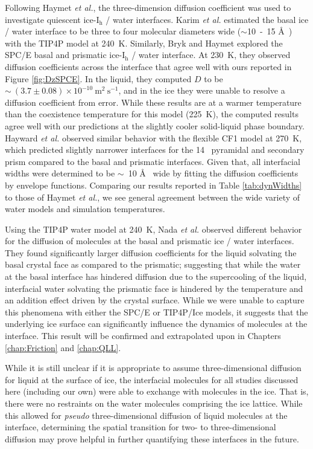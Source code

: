Following Haymet \textit{et al.}, the three-dimension diffusion
coefficient was used to investigate quiescent ice-I$_\mathrm{h}$ /
water
interfaces. \cite{Karim1987,Karim1988,Hayward2001,Bryk2002,Hayward2002}
Karim \textit{et al.} estimated the basal ice / water interface to be
three to four molecular diameters wide ($\sim$10~-~15 \AA~) with the
TIP4P model at 240~K.\cite{Karim1987,Karim1988} Similarly, Bryk and
Haymet explored the SPC/E basal and prismatic ice-I$_\mathrm{h}$ /
water interface.\cite{Bryk2002} At 230~K, they observed diffusion
coefficients across the interface that agree well with ours reported
in Figure \ref{fig:DzSPCE}. In the liquid, they computed $D$ to be
$\sim~(3.7 \pm 0.08) \times 10^{-10}~\mathrm{m}^{2}~\mathrm{s}^{-1}$,
and in the ice they were unable to resolve a diffusion coefficient
from error. While these results are at a warmer temperature than the
coexistence temperature for this model (225~K), the computed results
agree well with our predictions at the slightly cooler solid-liquid
phase boundary. Hayward \textit{et al.} observed similar behavior with
the flexible CF1 model at 270~K, which predicted slightly narrower
interfaces for the 14\degree~ pyramidal and secondary prism compared
to the basal and prismatic interfaces.\cite{Hayward2001,Hayward2002}
Given that, all interfacial widths were determined to be $\sim$~10
\AA~ wide by fitting the diffusion coefficients by envelope
functions. Comparing our results reported in Table \ref{tab:dynWidths}
to those of Haymet \textit{et al.}, we see general agreement between
the wide variety of water models and simulation temperatures.

Using the TIP4P water model at 240~K, Nada \textit{et al.}  observed
different behavior for the diffusion of molecules at the basal and
prismatic ice / water interfaces.\cite{Nada1995} They found
significantly larger diffusion coefficients for the liquid solvating
the basal crystal face as compared to the prismatic; suggesting that
while the water at the basal interface has hindered diffusion due to
the supercooling of the liquid, interfacial water solvating the
prismatic face is hindered by the temperature and an addition effect
driven by the crystal surface. While we were unable to capture this
phenomena with either the SPC/E or TIP4P/Ice models, it suggests that
the underlying ice surface can significantly influence the dynamics of
molecules at the interface. This result will be confirmed and
extrapolated upon in Chapters \ref{chap:Friction} and 
\ref{chap:QLL}.

While it is still unclear if it is appropriate to assume
three-dimensional diffusion for liquid at the surface of ice, the
interfacial molecules for all studies discussed here (including our
own) were able to exchange with molecules in the ice. That is, there
were no restraints on the water molecules comprising the ice
lattice. While this allowed for \textit{pseudo} three-dimensional
diffusion of liquid molecules at the interface, determining the
spatial transition for two- to three-dimensional diffusion may prove
helpful in further quantifying these interfaces in the future.

